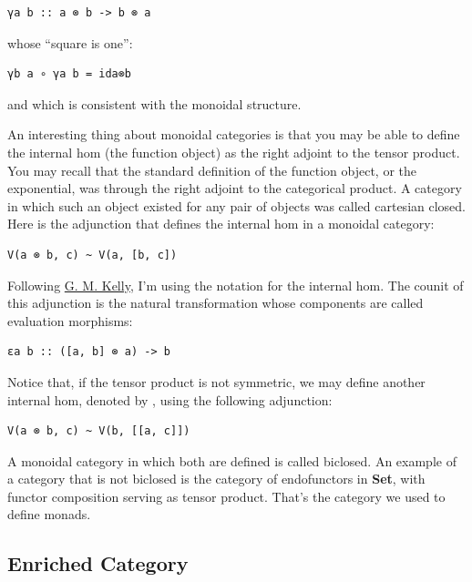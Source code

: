 \begin{verbatim}
γa b :: a ⊗ b -> b ⊗ a
\end{verbatim}

whose ``square is one'':

\begin{verbatim}
γb a ∘ γa b = ida⊗b
\end{verbatim}

and which is consistent with the monoidal structure.

An interesting thing about monoidal categories is that you may be able
to define the internal hom (the function object) as the right adjoint to
the tensor product. You may recall that the standard definition of the
function object, or the exponential, was through the right adjoint to
the categorical product. A category in which such an object existed for
any pair of objects was called cartesian closed. Here is the adjunction
that defines the internal hom in a monoidal category:

\begin{verbatim}
V(a ⊗ b, c) ~ V(a, [b, c])
\end{verbatim}

Following
\href{http://www.tac.mta.ca/tac/reprints/articles/10/tr10.pdf}{G. M.
Kelly}, I'm using the notation \code{{[}b,\ c{]}} for the internal
hom. The counit of this adjunction is the natural transformation whose
components are called evaluation morphisms:

\begin{verbatim}
εa b :: ([a, b] ⊗ a) -> b
\end{verbatim}

Notice that, if the tensor product is not symmetric, we may define
another internal hom, denoted by \code{{[}{[}a,\ c{]}{]}}, using the
following adjunction:

\begin{verbatim}
V(a ⊗ b, c) ~ V(b, [[a, c]])
\end{verbatim}

A monoidal category in which both are defined is called biclosed. An
example of a category that is not biclosed is the category of
endofunctors in \textbf{Set}, with functor composition serving as tensor
product. That's the category we used to define monads.

\subsection{Enriched Category}\label{enriched-category}

